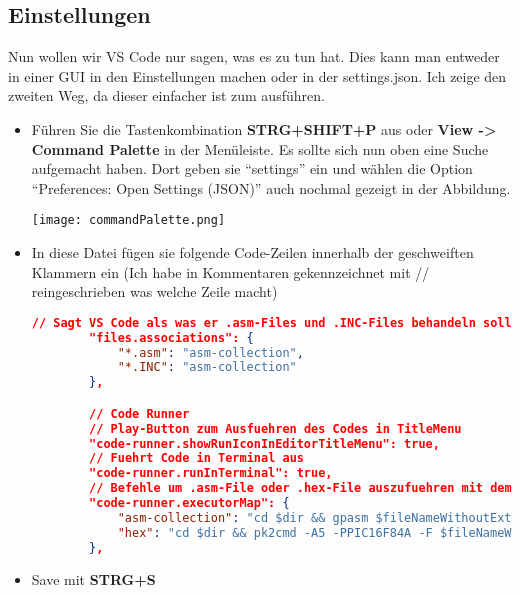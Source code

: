 \subsection{Einstellungen}
Nun wollen wir VS Code nur sagen, was es zu tun hat. Dies kann man entweder in einer GUI in den Einstellungen machen oder in der {\ttfamily settings.json}. Ich zeige den zweiten Weg, da dieser einfacher ist zum ausführen.
\begin{itemize}
    \item[1)] Führen Sie die Tastenkombination \textbf{STRG+SHIFT+P} aus oder \textbf{View -> Command Palette} in der Menüleiste. Es sollte sich nun oben eine Suche aufgemacht haben. Dort geben sie \enquote{settings} ein und wählen die Option \enquote{Preferences: Open Settings (JSON)} auch nochmal gezeigt in der Abbildung.
    \begin{center}
        \texttt{[image: commandPalette.png]}
    \end{center}
    \item[2)] In diese Datei fügen sie folgende Code-Zeilen innerhalb der geschweiften Klammern ein (Ich habe in Kommentaren gekennzeichnet mit // reingeschrieben was welche Zeile macht)
    \begin{lstlisting}[language=json]
        // Sagt VS Code als was er .asm-Files und .INC-Files behandeln soll
        "files.associations": {
            "*.asm": "asm-collection",
            "*.INC": "asm-collection"
        },

        // Code Runner
        // Play-Button zum Ausfuehren des Codes in TitleMenu
        "code-runner.showRunIconInEditorTitleMenu": true,
        // Fuehrt Code in Terminal aus
        "code-runner.runInTerminal": true,
        // Befehle um .asm-File oder .hex-File auszufuehren mit dem PIC16F84A als Standard PIC
        "code-runner.executorMap": {
            "asm-collection": "cd $dir && gpasm $fileNameWithoutExt.asm &&  pk2cmd -A5 -PPIC16F84A -F $fileNameWithoutExt.hex -M -T -R && cd $workspaceRoot",
            "hex": "cd $dir && pk2cmd -A5 -PPIC16F84A -F $fileNameWithoutExt.hex -M -T -R"
        },
    \end{lstlisting}
    \item[3)] Save mit \textbf{STRG+S}
\end{itemize}

